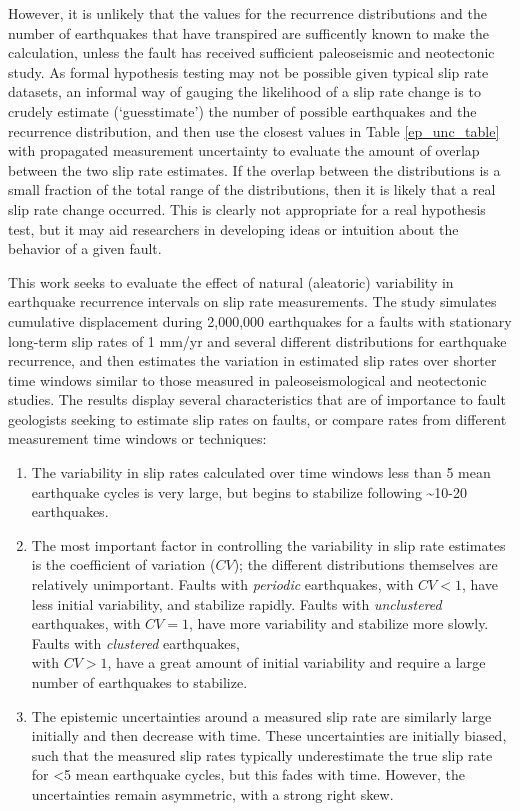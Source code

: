 \documentclass[se, manuscript]{copernicus}
\begin{document}
However, it is unlikely that the values for the recurrence distributions
and the number of earthquakes that have transpired are sufficently known
to make the calculation, unless the fault has received sufficient
paleoseismic and neotectonic study. As formal hypothesis testing may not
be possible given typical slip rate datasets, an informal way of gauging
the likelihood of a slip rate change is to crudely estimate
(`guesstimate') the number of possible earthquakes and the recurrence
distribution, and then use the closest values in Table
\ref{ep_unc_table} with propagated measurement uncertainty to evaluate
the amount of overlap between the two slip rate estimates. If the
overlap between the distributions is a small fraction of the total range
of the distributions, then it is likely that a real slip rate change
occurred. This is clearly not appropriate for a real hypothesis test,
but it may aid researchers in developing ideas or intuition about the
behavior of a given fault.

\conclusions

This work seeks to evaluate the effect of natural (aleatoric) variability in 
earthquake recurrence intervals on slip rate
measurements. The study simulates cumulative displacement during
2,000,000 earthquakes for a faults with stationary long-term slip rates
of 1 mm/yr and several different distributions for earthquake
recurrence, and then estimates the variation in estimated slip rates
over shorter time windows similar to those measured in
paleoseismological and neotectonic studies. The results display several
characteristics that are of importance to fault geologists seeking to
estimate slip rates on faults, or compare rates from different
measurement time windows or techniques:

\begin{enumerate}
\def\labelenumi{\arabic{enumi}.}
\item
  The variability in slip rates calculated over time windows less than 5
  mean earthquake cycles is very large, but begins to stabilize
  following \textasciitilde{}10-20 earthquakes.
\item
  The most important factor in controlling the variability in slip rate
  estimates is the coefficient of variation (\(CV\)); the different
  distributions themselves are relatively unimportant. Faults with
  \emph{periodic} earthquakes, with \(CV < 1\), have less initial
  variability, and stabilize rapidly. Faults with \emph{unclustered}
  earthquakes, with \(CV = 1\), have more variability and stabilize
  more slowly. Faults with \emph{clustered} earthquakes,\\
  with \(CV > 1\), have a great amount of initial variability and
  require a large number of earthquakes to stabilize.
\item
  The epistemic uncertainties around a measured slip rate are similarly
  large initially and then decrease with time. These uncertainties are
  initially biased, such that the measured slip rates typically
  underestimate the true slip rate for \textless{}5 mean earthquake
  cycles, but this fades with time. However, the uncertainties remain
  asymmetric, with a strong right skew.
\end{enumerate}
\end{document}
